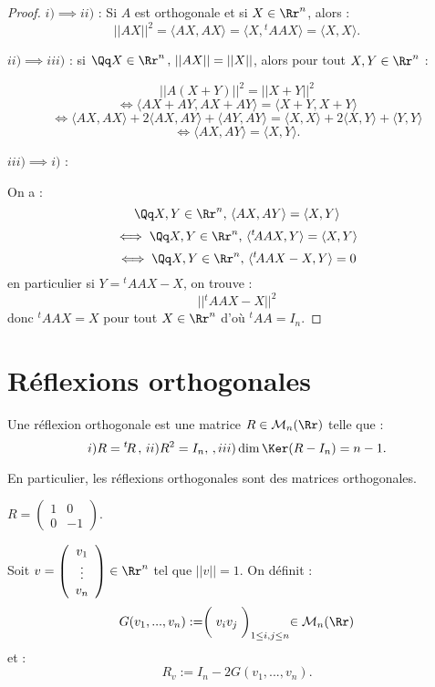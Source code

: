 \documentclass[class=report,crop=false]{standalone}
\begin{document}
\begin{proof}
{ \boldmath$i) \implies ii)$ :} Si $A$ est orthogonale et si $X \in \Rr^n$, alors : 
\[||AX||^2 =\langle AX,AX\rangle = \langle X , {}^t\!AA X \rangle = \langle X, X\rangle.  \]

{\boldmath $ii) \implies iii) $ :} si $\Qq X \in \Rr^n \,,\, ||AX || = ||X||$, alors pour tout $X,Y\in \Rr^n$ :

\[||A(X+Y)||^2 = ||X+Y||^2 \]
\[\iff \langle AX + AY , AX +AY \rangle = \langle X+Y , X+Y \rangle \]
\[ \iff \langle AX , AX \rangle + 2 \langle AX , AY \rangle + \langle AY , AY \rangle = \langle X , X \rangle + 2 \langle X , Y\rangle + \langle Y , Y \rangle\] 
\[\iff \langle AX , AY \rangle = \langle X ,Y \rangle .\]

{\boldmath $iii) \implies i)$ :}

On a :
\[\Qq X,Y \in \Rr^n, \, \langle AX, AY \rangle = \langle X,Y\rangle \]
\[\iff \Qq X,Y \in \Rr^n, \, \langle {}^t\!AAX, Y \rangle = \langle X,Y\rangle \]
\[\iff \Qq X,Y \in \Rr^n, \, \langle {}^t\!AAX-X, Y \rangle = 0 \]
en particulier si $Y = {}^t\!AAX -X$, on trouve : \[|| {}^t\!AAX -X||^2 \]
donc ${}^t\!AAX =X$ pour tout $X \in \Rr^n$ d'où ${}^t\! AA = I_n$.


\end{proof}

\section{Réflexions orthogonales}

\begin{definition}
Une réflexion orthogonale est une matrice $R \in \mathcal{M}_n(\Rr)$ telle que :
\[i) R = {}^t\!R \,,\, ii) R^2 =I_n ,\,, iii) \dim \Ker (R-I_n)= n-1.\]
\end{definition}

En particulier, les réflexions orthogonales sont des matrices orthogonales.

\begin{exemple}
$R=\left(\begin{array}{cc}
1 & 0\\
0& -1
\end{array}\right)$.
\end{exemple}

\begin{definition}
Soit $v= \left(\begin{array}{c}
v_1\\
\vdots\\
v_n
\end{array}\right) \in \Rr^n$ tel que $||v|| =1$. On définit :
\[G(v_1,...,v_n) := \biggm( v_iv_j\biggm)_{1 \le i,j\le n} \in \mathcal{M}_n(\Rr) \]
et :
\[R_v := I_n -2G(v_1,...,v_n). \]
\end{definition}
\end{document}
